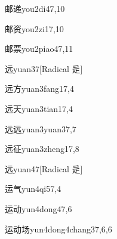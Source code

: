 \begin{verbete}{邮递}{you2di4}{7,10}
\end{verbete}

\begin{verbete}{邮资}{you2zi1}{7,10}
\end{verbete}

\begin{verbete}{邮票}{you2piao4}{7,11}
\end{verbete}

\begin{verbete}{远}{yuan3}{7}[Radical 辵]
\end{verbete}

\begin{verbete}{远方}{yuan3fang1}{7,4}
\end{verbete}

\begin{verbete}{远天}{yuan3tian1}{7,4}
\end{verbete}

\begin{verbete}{远远}{yuan3yuan3}{7,7}
\end{verbete}

\begin{verbete}{远征}{yuan3zheng1}{7,8}
\end{verbete}

\begin{verbete}{远}{yuan4}{7}[Radical 辵]
\end{verbete}

\begin{verbete}{运气}{yun4qi5}{7,4}
\end{verbete}

\begin{verbete}{运动}{yun4dong4}{7,6}
\end{verbete}

\begin{verbete}{运动场}{yun4dong4chang3}{7,6,6}
\end{verbete}

